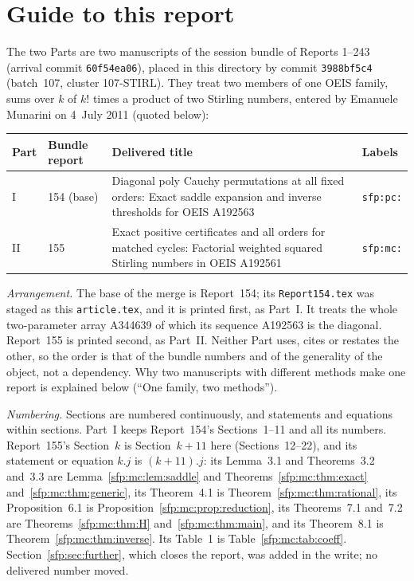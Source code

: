 \documentclass[11pt,letterpaper]{article}
\numberwithin{equation}{section}
\theoremstyle{definition}\newtheorem{definition}[theorem]{Definition}
\theoremstyle{remark}\newtheorem{remark}[theorem]{Remark}
\newcommand{\file}[1]{\nolinkurl{#1}}
\begin{document}
\section*{Guide to this report}\label{sfp:sec:guide}
The two Parts are two manuscripts of the session bundle of Reports 1--243 (arrival commit \texttt{60f54ea06}), placed in this directory by commit \texttt{3988bf5c4} (batch~107, cluster 107-STIRL). They treat two members of one OEIS family, sums over $k$ of $k!$ times a product of two Stirling numbers, entered by Emanuele Munarini on 4~July 2011 (quoted below):
\begin{center}
\small
\begin{tabular}{@{}l l >{\raggedright\arraybackslash}p{} l@{}}
\toprule
Part & Bundle report & Delivered title & Labels\\
\midrule
I & 154 (base) & Diagonal poly Cauchy permutations at all fixed orders: Exact saddle expansion and inverse thresholds for OEIS A192563 & \texttt{sfp:pc:}\\
II & 155 & Exact positive certificates and all orders for matched cycles: Factorial weighted squared Stirling numbers in OEIS A192561 & \texttt{sfp:mc:}\\
\bottomrule
\end{tabular}
\end{center}
\emph{Arrangement.} The base of the merge is Report~154; its \file{Report154.tex} was staged as this \file{article.tex}, and it is printed first, as Part~I. It treats the whole two-parameter array A344639 of which its sequence A192563 is the diagonal. Report~155 is printed second, as Part~II. Neither Part uses, cites or restates the other, so the order is that of the bundle numbers and of the generality of the object, not a dependency. Why two manuscripts with different methods make one report is explained below (``One family, two methods'').

\emph{Numbering.} Sections are numbered continuously, and statements and equations within sections. Part~I keeps Report~154's Sections~1--11 and all its numbers. Report~155's Section~$k$ is Section~$k+11$ here (Sections~12--22), and its statement or equation $k.j$ is $(k+11).j$: its Lemma~3.1 and Theorems~3.2 and~3.3 are Lemma~\ref{sfp:mc:lem:saddle} and Theorems~\ref{sfp:mc:thm:exact} and~\ref{sfp:mc:thm:generic}, its Theorem~4.1 is Theorem~\ref{sfp:mc:thm:rational}, its Proposition~6.1 is Proposition~\ref{sfp:mc:prop:reduction}, its Theorems~7.1 and~7.2 are Theorems~\ref{sfp:mc:thm:H} and~\ref{sfp:mc:thm:main}, and its Theorem~8.1 is Theorem~\ref{sfp:mc:thm:inverse}. Its Table~1 is Table~\ref{sfp:mc:tab:coeff}. Section~\ref{sfp:sec:further}, which closes the report, was added in the write; no delivered number moved.
\end{document}
